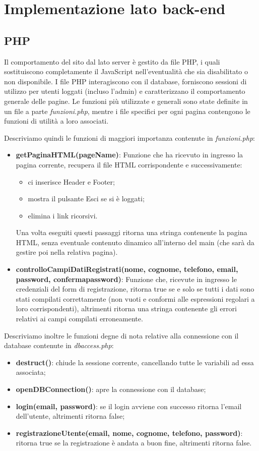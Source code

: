 \section{Implementazione lato back-end}

\subsection{PHP}
Il comportamento del sito dal lato server è gestito da file PHP, i quali sostituiscono completamente il JavaScript nell'eventualità che sia disabilitato o non disponibile. I file PHP interagiscono con il database, forniscono sessioni di utilizzo per utenti loggati (incluso l'admin) e caratterizzano il comportamento generale delle pagine. Le funzioni più utilizzate e generali sono state definite in un file a parte \textit{funzioni.php}, mentre i file specifici per ogni pagina contengono le funzioni di utilità a loro associati. 

Descriviamo quindi le funzioni di maggiori importanza contenute in \textit{funzioni.php}:
\begin{itemize}
\item \textbf{getPaginaHTML(pageName)}: Funzione che ha ricevuto in ingresso la pagina corrente, recupera il file HTML corrispondente e successivamente:
\begin{itemize}
\item ci inserisce Header e Footer;
\item mostra il pulsante Esci se si è loggati;
\item elimina i link ricorsivi.
\end{itemize}
Una volta eseguiti questi passaggi ritorna una stringa contenente la pagina HTML, senza eventuale contenuto dinamico all'interno del main (che sarà da gestire poi nella relativa pagina).
\item \textbf{controlloCampiDatiRegistrati(nome, cognome, telefono, email, password, confermapassword)}: Funzione che, ricevute in ingresso le credenziali del form di registrazione, ritorna true se e solo se tutti i dati sono stati compilati correttamente (non vuoti e conformi alle espressioni regolari a loro corrispondenti), altrimenti ritorna una stringa contenente gli errori relativi ai campi compilati erroneamente. \\
\end{itemize}


Descriviamo inoltre le funzioni degne di nota relative alla connessione con il database contenute in \textit{dbaccess.php}:
\begin{itemize}
\item \textbf{destruct()}: chiude la sessione corrente, cancellando tutte le variabili ad essa associata;
\item \textbf{openDBConnection()}: apre la connessione con il database;
\item \textbf{login(email, password)}: se il login avviene con successo ritorna l'email dell'utente, altrimenti ritorna false;
\item \textbf{registrazioneUtente(email, nome, cognome, telefono, password)}: ritorna true se la registrazione è andata a buon fine, altrimenti ritorna false.
\end{itemize}


